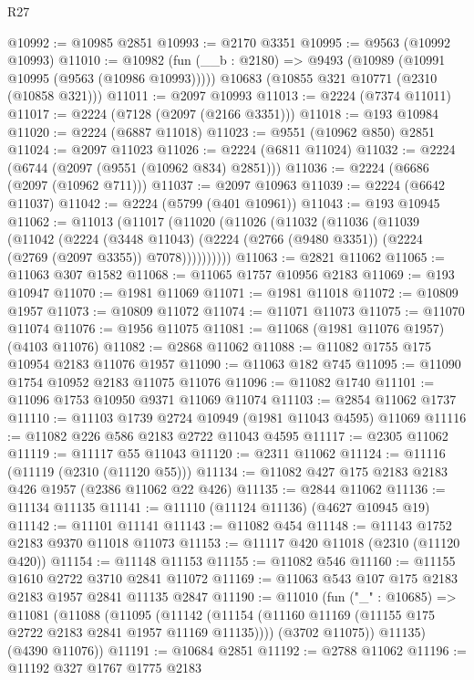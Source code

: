 \begin{lexlean}{R27}
\begin{coremodule}
@10992 := @10985 @2851
@10993 := @2170 @3351
@10995 := @9563 (@10992 @10993)
@11010 := @10982
    (fun (__b : @2180) => @9493 (@10989 (@10991 @10995 (@9563 (@10986 @10993)))))
    @10683
    (@10855 @321 @10771 (@2310 (@10858 @321)))
@11011 := @2097 @10993
@11013 := @2224 (@7374 @11011)
@11017 := @2224 (@7128 (@2097 (@2166 @3351)))
@11018 := @193 @10984
@11020 := @2224 (@6887 @11018)
@11023 := @9551 (@10962 @850) @2851
@11024 := @2097 @11023
@11026 := @2224 (@6811 @11024)
@11032 := @2224 (@6744 (@2097 (@9551 (@10962 @834) @2851)))
@11036 := @2224 (@6686 (@2097 (@10962 @711)))
@11037 := @2097 @10963
@11039 := @2224 (@6642 @11037)
@11042 := @2224 (@5799 (@401 @10961))
@11043 := @193 @10945
@11062 := @11013
    (@11017
      (@11020
        (@11026
          (@11032
            (@11036
              (@11039
                (@11042
                  (@2224
                    (@3448 @11043)
                    (@2224 (@2766 (@9480 @3351)) (@2224 (@2769 (@2097 @3355)) @7078))))))))))
@11063 := @2821 @11062
@11065 := @11063 @307 @1582
@11068 := @11065 @1757 @10956 @2183
@11069 := @193 @10947
@11070 := @1981 @11069
@11071 := @1981 @11018
@11072 := @10809 @1957
@11073 := @10809 @11072
@11074 := @11071 @11073
@11075 := @11070 @11074
@11076 := @1956 @11075
@11081 := @11068 (@1981 @11076 @1957) (@4103 @11076)
@11082 := @2868 @11062
@11088 := @11082 @1755 @175 @10954 @2183 @11076 @1957
@11090 := @11063 @182 @745
@11095 := @11090 @1754 @10952 @2183 @11075 @11076
@11096 := @11082 @1740
@11101 := @11096 @1753 @10950 @9371 @11069 @11074
@11103 := @2854 @11062 @1737
@11110 := @11103 @1739 @2724 @10949 (@1981 @11043 @4595) @11069
@11116 := @11082 @226 @586 @2183 @2722 @11043 @4595
@11117 := @2305 @11062
@11119 := @11117 @55 @11043
@11120 := @2311 @11062
@11124 := @11116 (@11119 (@2310 (@11120 @55)))
@11134 := @11082 @427 @175 @2183 @2183 @426 @1957 (@2386 @11062 @22 @426)
@11135 := @2844 @11062
@11136 := @11134 @11135
@11141 := @11110 (@11124 @11136) (@4627 @10945 @19)
@11142 := @11101 @11141
@11143 := @11082 @454
@11148 := @11143 @1752 @2183 @9370 @11018 @11073
@11153 := @11117 @420 @11018 (@2310 (@11120 @420))
@11154 := @11148 @11153
@11155 := @11082 @546
@11160 := @11155 @1610 @2722 @3710 @2841 @11072
@11169 := @11063 @543 @107 @175 @2183 @2183 @1957 @2841 @11135 @2847
@11190 := @11010
    (fun ("_" : @10685) =>
    @11081
      (@11088
        (@11095
          (@11142 (@11154 (@11160 @11169 (@11155 @175 @2722 @2183 @2841 @1957 @11169 @11135))))
          (@3702 @11075))
        @11135)
      (@4390 @11076))
@11191 := @10684 @2851
@11192 := @2788 @11062
@11196 := @11192 @327 @1767 @1775 @2183

\end{coremodule}
\end{lexlean}
